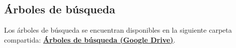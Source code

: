 
\FloatBarrier

\subsection{Árboles de búsqueda}\label{sec:01-sudoku-arboles}
Los árboles de búsqueda se encuentran disponibles en la siguiente carpeta compartida:
\href{https://drive.google.com/drive/folders/125bijiUVxOe8lKL5cBToh5QjyLDW0jIM?usp=sharing}{\textbf{Árboles de búsqueda (Google Drive)}}.
